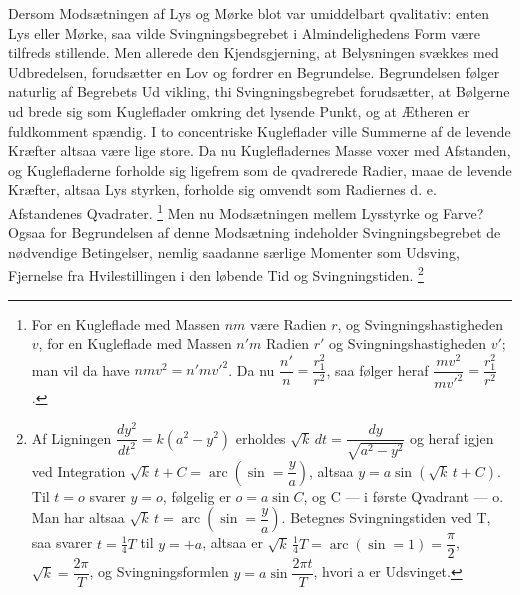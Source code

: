 \documentclass[12pt,a4paper]{book}
\renewcommand{\thefootnote}{*)}
\begin{document}
Dersom Modsætningen af Lys og Mørke blot var umiddelbart qvalitativ:
enten Lys eller Mørke, saa vilde Svingningsbegrebet i Almindelighedens
Form være tilfreds\-%
stillende. Men allerede den Kjendsgjerning, at Belysningen svækkes med
Udbredelsen, forudsætter en Lov og fordrer en Begrundelse.
Begrundelsen følger naturlig af Begrebets Ud\-%
vikling, thi Svingningsbegrebet forudsætter, at Bølgerne ud\-%
brede sig som Kugleflader omkring det lysende Punkt, og at Ætheren er
fuldkomment spændig. I to concentriske Kugleflader ville Summerne af
de levende Kræfter altsaa være lige store. Da nu Kuglefladernes Masse
voxer med Afstanden, og Kuglefladerne forholde sig ligefrem som de
qvadrerede Radier, maae de levende Kræfter, altsaa Lys\-%
styrken, forholde sig omvendt som Radiernes d. e. Afstandenes
Qvadrater.%
\footnote{%
For en Kugleflade med Massen $nm$ være Radien $r$, og
Svingningshastigheden $v$, for en Kugleflade med Massen $n'm$ Radien
$r'$ og Svingningshastigheden $v'$; man vil da have
$nmv^{2} = n'mv'^{2}$. Da nu $\dfrac{n'}{n} = \dfrac{r_{1}^{2}}{r^{2}}$,
saa følger heraf $\dfrac{mv^{2}}{mv'^{2}} = \dfrac{r_{1}^{2}}{r^{2}}$.}
Men nu Modsætningen mellem Lysstyrke og Farve? Ogsaa for Begrundelsen
af denne Modsætning indeholder Svingningsbegrebet de nødvendige
Betingelser, nemlig saadanne særlige Momenter som Udsving, Fjernelse
fra Hvilestillingen i den løbende Tid og Svingningstiden.%
\renewcommand{\thefootnote}{**)}%
\footnote{%
Af Ligningen $\dfrac{dy^{2}}{dt^{2}} = k(a^{2}-y^{2})$ erholdes
$\sqrt{k}\,dt = \dfrac{dy}{\sqrt{a^{2}-y^{2}}}$ og heraf igjen ved
Integration
$\sqrt{k}\,t + C = \operatorname{arc}\left(\sin = \dfrac{y}{a}\right)$,
altsaa $y = a\sin(\sqrt{k}\,t + C)$. Til $t = o$ svarer $y = o$,
følgelig er $o = a\sin C$, og C --- i første Qvadrant --- o. Man har
altsaa
$\sqrt{k}\,t = \operatorname{arc}\left(\sin = \dfrac{y}{a}\right)$.
Betegnes Svingningstiden ved T, saa svarer $t = \tfrac{1}{4}T$ til
$y = +a$, altsaa er
$\sqrt{k}\,\tfrac{1}{4}T = \operatorname{arc}(\sin = 1) = \dfrac{\pi}{2}$,
$\sqrt{k} = \dfrac{2\pi}{T}$, og Svingningsformlen
$y = a\sin\dfrac{2\pi t}{T}$, hvori a er Udsvinget.}%
\end{document}
